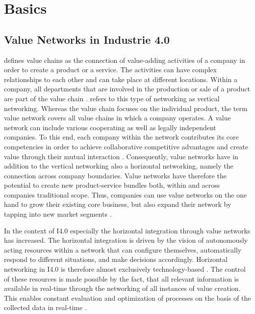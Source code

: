 \chapter{Basics}
\section{Value Networks in Industrie 4.0}
\citet[p. 6]{Sturgeon2001HowNetworks} defines value chains as the connection of value-adding activities of a company in order to create a product or a service. The activities can have complex relationships to each other and can take place at different locations. Within a company, all departments that are involved in the production or sale of a product are part of the value chain \cite[p. 10]{Sturgeon2001HowNetworks}. \citeauthor{Sturgeon2001HowNetworks} refers to this type of networking as vertical networking. Whereas the value chain focuses on the individual product, the term value network covers all value chains in which a company operates. A value network can include various cooperating as well as legally independent companies. To this end, each company within the network contributes its core competencies in order to achieve collaborative competitive advantages and create value through their mutual interaction \cite[p. 3]{Bach2010GeschaftsmodelleGrundlagen}. Consequently, value networks have in addition to the vertical networking also a horizontal networking, namely the connection across company boundaries. Value networks have therefore the potential to create new product-service bundles both, within and across companies traditional scope. Thus, companies can use value networks on the one hand to grow their existing core business, but also expand their network by tapping into new market segments \cite[p. 22]{Acatech2013Recommendations4.0}.

In the context of \ac{I4.0} especially the horizontal integration through value networks has increased. The horizontal integration is driven by the vision of autonomously acting resources within a network that can configure themselves, automatically respond to different situations, and make decisions accordingly. Horizontal networking in \ac{I4.0} is therefore almost exclusively technology-based \cite[p. 20, 21]{Acatech2013Recommendations4.0}. The control of these resources is made possible by the fact, that all relevant information is available in real-time through the networking of all instances of value creation. This enables constant evaluation and optimization of processes on the basis of the collected data in real-time \cite[p. 24]{Acatech2013Recommendations4.0}. 

